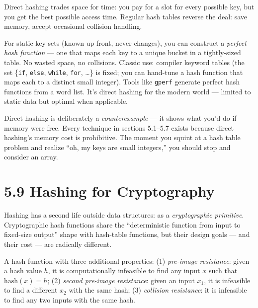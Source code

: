 \documentclass[11pt]{article}
\begin{document}
Direct hashing trades space for time: you pay for a slot for
every possible key, but you get the best possible access time.
Regular hash tables reverse the deal: save memory, accept
occasional collision handling.

\begin{notebox}
For static key sets (known up front, never changes), you can
construct a \emph{perfect hash function} --- one that maps each
key to a unique bucket in a tightly-sized table. No wasted space,
no collisions. Classic use: compiler keyword tables (the set
\{\texttt{if}, \texttt{else}, \texttt{while}, \texttt{for},
\ldots\} is fixed; you can hand-tune a hash function that maps
each to a distinct small integer). Tools like \texttt{gperf}
generate perfect hash functions from a word list. It's direct
hashing for the modern world --- limited to static data but
optimal when applicable.
\end{notebox}

\begin{ideabox}
Direct hashing is deliberately a \emph{counterexample} --- it
shows what you'd do if memory were free. Every technique in
sections 5.1--5.7 exists because direct hashing's memory cost is
prohibitive. The moment you squint at a hash table problem and
realize ``oh, my keys are small integers,'' you should stop and
consider an array.
\end{ideabox}

\section{5.9 Hashing for Cryptography}

Hashing has a second life outside data structures: as a
\emph{cryptographic primitive}. Cryptographic hash functions
share the ``deterministic function from input to fixed-size
output'' shape with hash-table functions, but their design
goals --- and their cost --- are radically different.

\begin{defnbox}
A hash function with three additional properties:
(1) \emph{pre-image resistance}: given a hash value $h$, it is
computationally infeasible to find any input $x$ such that
$\text{hash}(x) = h$;
(2) \emph{second pre-image resistance}: given an input $x_1$, it
is infeasible to find a different $x_2$ with the same hash;
(3) \emph{collision resistance}: it is infeasible to find any
two inputs with the same hash.
\end{defnbox}
\end{document}
